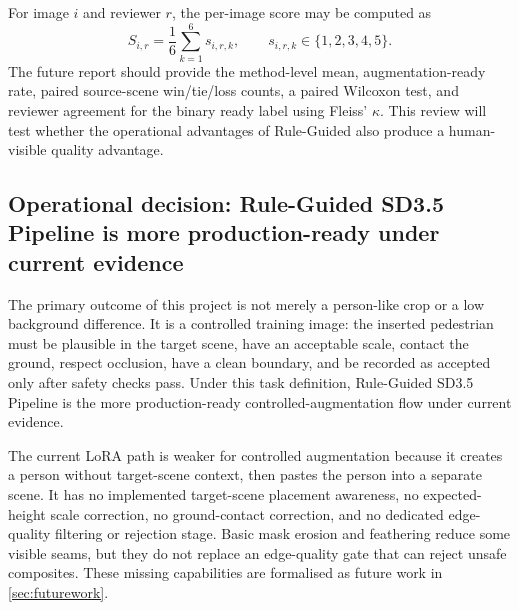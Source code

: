 \documentclass[11pt,a4paper]{article}
\begin{document}
For image $i$ and reviewer $r$, the per-image score may be computed as
\begin{equation}\label{eq:manualscore}
S_{i,r}=\frac{1}{6}\sum_{k=1}^{6}s_{i,r,k}, \qquad s_{i,r,k}\in\{1,2,3,4,5\}.
\end{equation}
The future report should provide the method-level mean, augmentation-ready rate, paired source-scene win/tie/loss counts, a paired Wilcoxon test, and reviewer agreement for the binary ready label using Fleiss' $\kappa$. This review will test whether the operational advantages of Rule-Guided also produce a human-visible quality advantage.

\subsection{Operational decision: Rule-Guided SD3.5 Pipeline is more production-ready under current evidence}\label{sec:decision}
The primary outcome of this project is not merely a person-like crop or a low background difference. It is a controlled training image: the inserted pedestrian must be plausible in the target scene, have an acceptable scale, contact the ground, respect occlusion, have a clean boundary, and be recorded as accepted only after safety checks pass. Under this task definition, Rule-Guided SD3.5 Pipeline is the more production-ready controlled-augmentation flow under current evidence.

The current LoRA path is weaker for controlled augmentation because it creates a person without target-scene context, then pastes the person into a separate scene. It has no implemented target-scene placement awareness, no expected-height scale correction, no ground-contact correction, and no dedicated edge-quality filtering or rejection stage. Basic mask erosion and feathering reduce some visible seams, but they do not replace an edge-quality gate that can reject unsafe composites. These missing capabilities are formalised as future work in \cref{sec:futurework}.
\end{document}
